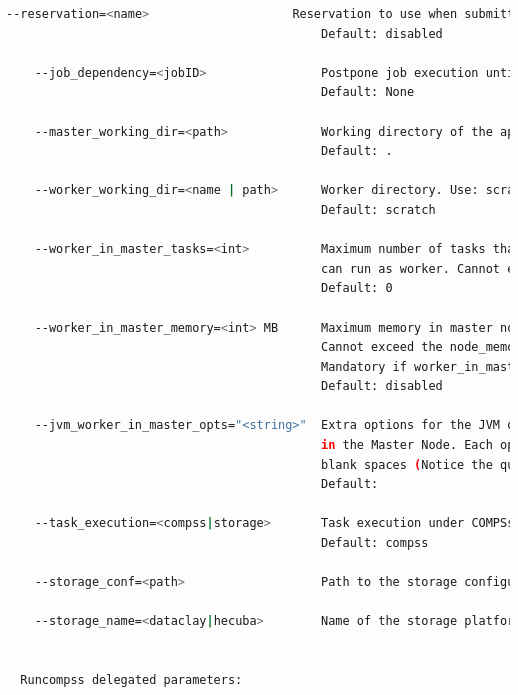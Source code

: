 \begin{lstlisting}[language=bash]
    --reservation=<name>                    Reservation to use when submitting the job. 
                                            Default: disabled
                                            
    --job_dependency=<jobID>                Postpone job execution until the job dependency has ended.
                                            Default: None

    --master_working_dir=<path>             Working directory of the application
                                            Default: .
                                            
    --worker_working_dir=<name | path>      Worker directory. Use: scratch | gpfs | <path>
                                            Default: scratch
                                            
    --worker_in_master_tasks=<int>          Maximum number of tasks that the master node 
                                            can run as worker. Cannot exceed tasks_per_node.
                                            Default: 0
                                            
    --worker_in_master_memory=<int> MB      Maximum memory in master node assigned to the worker.
                                            Cannot exceed the node_memory.
                                            Mandatory if worker_in_master_tasks is specified.
                                            Default: disabled
                                            
    --jvm_worker_in_master_opts="<string>"  Extra options for the JVM of the COMPSs Worker 
                                            in the Master Node. Each option separed by "," and without 
                                            blank spaces (Notice the quotes)
                                            Default: 
                                            
    --task_execution=<compss|storage>       Task execution under COMPSs or Storage.
                                            Default: compss
                                            
    --storage_conf=<path>                   Path to the storage configuration file
    
    --storage_name=<dataclay|hecuba>        Name of the storage platform dataClay or Hecuba.
    

  Runcompss delegated parameters:


\end{lstlisting}
